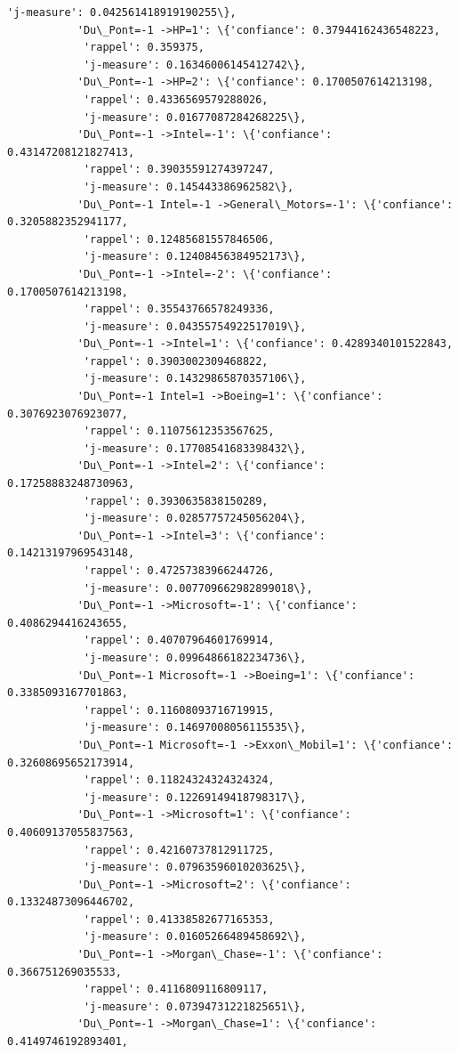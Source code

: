 \documentclass[11pt]{article}
\begin{document}
\begin{Verbatim}[commandchars=\\\{\}]
            'j-measure': 0.042561418919190255\},
           'Du\_Pont=-1 ->HP=1': \{'confiance': 0.37944162436548223,
            'rappel': 0.359375,
            'j-measure': 0.16346006145412742\},
           'Du\_Pont=-1 ->HP=2': \{'confiance': 0.1700507614213198,
            'rappel': 0.4336569579288026,
            'j-measure': 0.01677087284268225\},
           'Du\_Pont=-1 ->Intel=-1': \{'confiance': 0.43147208121827413,
            'rappel': 0.39035591274397247,
            'j-measure': 0.145443386962582\},
           'Du\_Pont=-1 Intel=-1 ->General\_Motors=-1': \{'confiance': 0.3205882352941177,
            'rappel': 0.12485681557846506,
            'j-measure': 0.12408456384952173\},
           'Du\_Pont=-1 ->Intel=-2': \{'confiance': 0.1700507614213198,
            'rappel': 0.35543766578249336,
            'j-measure': 0.04355754922517019\},
           'Du\_Pont=-1 ->Intel=1': \{'confiance': 0.4289340101522843,
            'rappel': 0.3903002309468822,
            'j-measure': 0.14329865870357106\},
           'Du\_Pont=-1 Intel=1 ->Boeing=1': \{'confiance': 0.3076923076923077,
            'rappel': 0.11075612353567625,
            'j-measure': 0.17708541683398432\},
           'Du\_Pont=-1 ->Intel=2': \{'confiance': 0.17258883248730963,
            'rappel': 0.3930635838150289,
            'j-measure': 0.02857757245056204\},
           'Du\_Pont=-1 ->Intel=3': \{'confiance': 0.14213197969543148,
            'rappel': 0.47257383966244726,
            'j-measure': 0.007709662982899018\},
           'Du\_Pont=-1 ->Microsoft=-1': \{'confiance': 0.4086294416243655,
            'rappel': 0.40707964601769914,
            'j-measure': 0.09964866182234736\},
           'Du\_Pont=-1 Microsoft=-1 ->Boeing=1': \{'confiance': 0.3385093167701863,
            'rappel': 0.11608093716719915,
            'j-measure': 0.14697008056115535\},
           'Du\_Pont=-1 Microsoft=-1 ->Exxon\_Mobil=1': \{'confiance': 0.32608695652173914,
            'rappel': 0.11824324324324324,
            'j-measure': 0.12269149418798317\},
           'Du\_Pont=-1 ->Microsoft=1': \{'confiance': 0.40609137055837563,
            'rappel': 0.42160737812911725,
            'j-measure': 0.07963596010203625\},
           'Du\_Pont=-1 ->Microsoft=2': \{'confiance': 0.13324873096446702,
            'rappel': 0.41338582677165353,
            'j-measure': 0.01605266489458692\},
           'Du\_Pont=-1 ->Morgan\_Chase=-1': \{'confiance': 0.366751269035533,
            'rappel': 0.4116809116809117,
            'j-measure': 0.07394731221825651\},
           'Du\_Pont=-1 ->Morgan\_Chase=1': \{'confiance': 0.4149746192893401,

\end{Verbatim}
\end{document}
